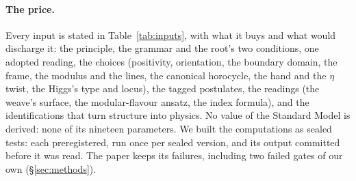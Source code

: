 \paragraph{The price.}
Every input is stated in Table~\ref{tab:inputs}, with what it buys and what would discharge it: the principle, the
grammar and the root's two conditions, one adopted reading, the choices (positivity, orientation, the boundary domain, the
frame, the modulus and the lines, the canonical horocycle, the hand and the $\eta$ twist, the Higgs's type and locus), the
tagged postulates, the readings (the weave's surface, the modular-flavour ansatz, the index formula), and the
identifications that turn structure into physics. No value of the Standard Model is derived:
none of its nineteen parameters. We built the computations as sealed tests: each preregistered,
run once per sealed version, and its output committed before it was read. The paper keeps its failures, including two failed gates of our own (\S\ref{sec:methods}).

